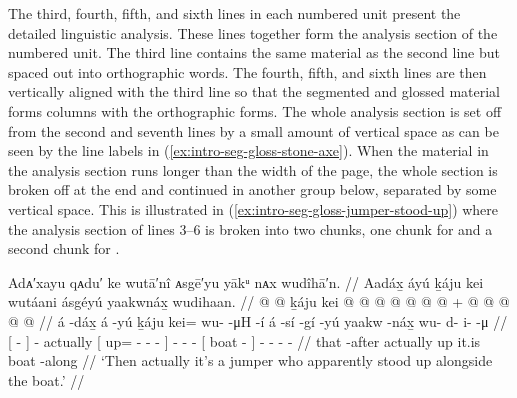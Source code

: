 The third, fourth, fifth, and sixth lines in each numbered unit present the detailed linguistic analysis.
These lines together form the analysis section of the numbered unit.
The third line contains the same material as the second line but spaced out into orthographic words.
The fourth, fifth, and sixth lines are then vertically aligned with the third line so that the segmented and glossed material forms columns with the orthographic forms.
The whole analysis section is set off from the second and seventh lines by a small amount of vertical space as can be seen by the line labels in (\ref{ex:intro-seg-gloss-stone-axe}).
When the material in the analysis section runs longer than the width of the page, the whole section is broken off at the end and continued in another group below, separated by some vertical space.
This is illustrated in (\ref{ex:intro-seg-gloss-jumper-stood-up}) where the analysis section of lines 3–6 is broken into two chunks, one chunk for  and a second chunk for .

\ex\label{ex:intro-seg-gloss-jumper-stood-up}%
%
\begingl
	\glpreamble{}%
		Adᴀ′xayu qᴀdu′ ke wutā′nî ᴀsgē′yu yākᵘ nᴀx wudîhā′n. //
	\glpreamble{}%
		Aadáx̱ áyú ḵáju kei wutáani ásgéyú yaakwnáx̱ wudihaan. //
	\gla{}%
		{}  @ {} {}  @ {} 
		ḵáju
		{} kei @  @ {} @ {} @ {} {}
		 @ {} @ {} @ {} +
		{}  @ {} {}
		 @ {} @ {} @ {} @ {} //
	\glb{}%
		{} á -dáx̱ {} á -yú
		ḵáju
		{} kei= wu-  -μH -í {}
		á -sí -gí -yú
		{} yaakw -náx̱ {}
		wu- d- i-  -μ //
	\glc{}%
		{}[  - {}]  - 
		actually
		{}[ up= -  - - {}]
		 - - -
		{}[ boat - {}]
		- - -  - //
	\gld{}%
		{} that -after {}  {}
		actually
		{} up  {} {} {} {}
		it.is \· {} {}
		{} boat -along {}
		 {} {} {} {} //
	\glft{}%
		‘Then actually it’s a jumper who apparently stood up alongside the boat.’
		//
\endgl
\xe

